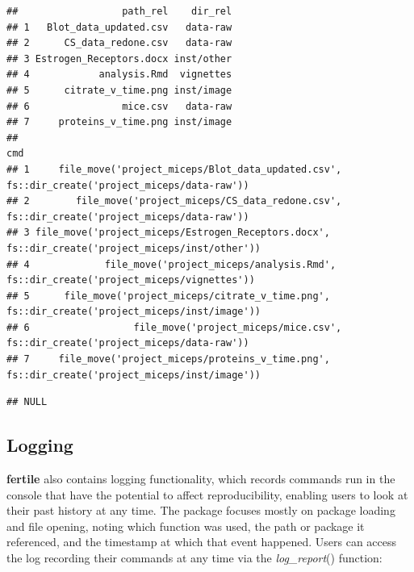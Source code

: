 \documentclass[APA,LATO1COL]{WileyNJD-v2}\usepackage[]{graphicx}\usepackage[]{color}
\makeatletter
\newenvironment{kframe}{%
 \def\at@end@of@kframe{}%
 \ifinner\ifhmode%
  \def\at@end@of@kframe{\end{minipage}}%
  \begin{minipage}{\columnwidth}%
 \fi\fi%
 \def\FrameCommand##1{\hskip\@totalleftmargin \hskip-\fboxsep
 \colorbox{shadecolor}{##1}\hskip-\fboxsep
     \hskip-\linewidth \hskip-\@totalleftmargin \hskip\columnwidth}%
 \MakeFramed {\advance\hsize-\width
   \@totalleftmargin\z@ \linewidth\hsize
   \@setminipage}}%
 {\par\unskip\endMakeFramed%
 \at@end@of@kframe}
\newenvironment{knitrout}{}{} %
\newcommand{\pkg}[1]{\textbf{#1}}
\newcommand{\func}[1]{\textit{#1}()}
\makeatother
\begin{document}
\begin{knitrout}
\begin{kframe}
{\ttfamily\noindent\itshape\color{messagecolor}{\#\# --\ \  Suggestions for moving files ----------------------------------- fertile 0.0.0.9027 --}}\begin{verbatim}
##                  path_rel    dir_rel
## 1   Blot_data_updated.csv   data-raw
## 2      CS_data_redone.csv   data-raw
## 3 Estrogen_Receptors.docx inst/other
## 4            analysis.Rmd  vignettes
## 5      citrate_v_time.png inst/image
## 6                mice.csv   data-raw
## 7     proteins_v_time.png inst/image
##                                                                                                cmd
## 1     file_move('project_miceps/Blot_data_updated.csv', fs::dir_create('project_miceps/data-raw'))
## 2        file_move('project_miceps/CS_data_redone.csv', fs::dir_create('project_miceps/data-raw'))
## 3 file_move('project_miceps/Estrogen_Receptors.docx', fs::dir_create('project_miceps/inst/other'))
## 4             file_move('project_miceps/analysis.Rmd', fs::dir_create('project_miceps/vignettes'))
## 5      file_move('project_miceps/citrate_v_time.png', fs::dir_create('project_miceps/inst/image'))
## 6                  file_move('project_miceps/mice.csv', fs::dir_create('project_miceps/data-raw'))
## 7     file_move('project_miceps/proteins_v_time.png', fs::dir_create('project_miceps/inst/image'))
\end{verbatim}


{\ttfamily\noindent\itshape\color{messagecolor}{\#\# --\ \  Problematic paths logged --------------------------------------- fertile 0.0.0.9027 --}}\begin{verbatim}
## NULL
\end{verbatim}
\end{kframe}
\end{knitrout}

\subsection{Logging}

\pkg{fertile} also contains logging functionality, which records commands run in the console that have the potential to affect reproducibility, enabling users to look at their past history at any time. The package focuses mostly on package loading and file opening, noting which function was used, the path or package it referenced, and the timestamp at which that event happened. Users can access the log recording their commands at any time via the \func{log\_report} function:
\end{document}
